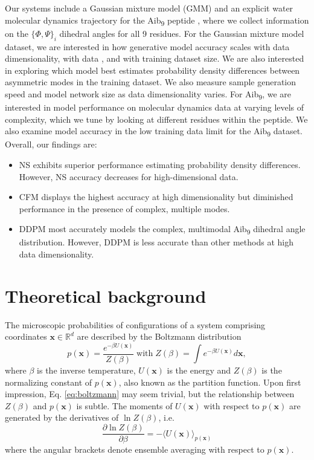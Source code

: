 \documentclass[%
 aip,
 amsmath,amssymb,
 reprint,%
]{revtex4-1}
\newcommand{\rj}[1]{{\color{red}{#1}}}
\begin{document}
Our systems include a Gaussian mixture model (GMM) and an explicit water molecular dynamics trajectory for the Aib\textsubscript{9} peptide \cite{shams-aib9, botan-peptide}, where we collect information on the $\{ \Phi,\Psi \}_i$ dihedral angles for all 9 residues. For the Gaussian mixture model dataset, we are interested in how generative model accuracy scales with data dimensionality, with data \rj{multimodality}, and with training dataset size. We are also interested in exploring which model best estimates probability density differences between asymmetric modes in the training dataset. We also measure sample generation speed and model network size as data dimensionality varies. For Aib\textsubscript{9}, we are interested in model performance on molecular dynamics data at varying levels of complexity, which we tune by looking at different residues within the peptide. We also examine model accuracy in the low training data limit for the Aib\textsubscript{9} dataset. Overall, our findings are:

\begin{itemize}
    \item NS exhibits superior performance estimating probability density differences. However, NS accuracy decreases for high-dimensional data.
    \item CFM displays the highest accuracy at high dimensionality but diminished performance in the presence of complex, multiple modes.
    \item DDPM most accurately models the complex, multimodal Aib\textsubscript{9} dihedral angle distribution. However, DDPM is less accurate than other methods at high data dimensionality.
\end{itemize}

\section{Theoretical background}

The microscopic probabilities of configurations of a system comprising coordinates $\mathbf{x}\in \mathbb{R}^d$ are described by the Boltzmann distribution
\begin{equation}
    \label{eq:boltzmann}
    p(\mathbf{x}) = \frac{e^{-\beta U(\mathbf{x})}}{Z(\beta)} \; \mathrm{with} \; Z(\beta) = \int e^{-\beta U(\mathbf{x})} d\mathbf{x},
\end{equation}
where $\beta$ is the inverse temperature, $U(\mathbf{x})$ is the energy and $Z(\beta)$ is the normalizing constant of $p(\mathbf{x})$, also known as the partition function. Upon first impression, Eq. \ref{eq:boltzmann} may seem trivial, but the relationship between $Z(\beta)$ and $p(\mathbf{x})$ is subtle. The moments of $U(\mathbf{x})$ with respect to $p(\mathbf{x})$ are generated by the derivatives of $\ln Z(\beta)$, i.e.
\begin{equation}
    \label{eq:pfunc-derivative}
    \frac{\partial \ln Z(\beta)}{\partial \beta} = -\langle U (\mathbf{x})\rangle_{p(\mathbf{x})}
\end{equation}
where the angular brackets denote ensemble averaging with respect to $p(\mathbf{x})$.
\end{document}
